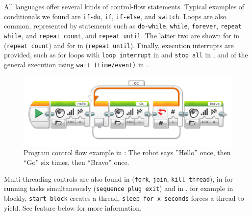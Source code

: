  All languages offer several kinds of control-flow statements. Typical examples of conditionals we found are \texttt{if-do}, \texttt{if}, \texttt{if-else}, and \texttt{switch}. Loops are also common, represented by statements such as \texttt{do-while}, \texttt{while}, \texttt{forever}, \texttt{repeat while}, and \texttt{repeat count}, and \texttt{repeat until}. The latter two are shown for \lego in  (\texttt{repeat count}) and for \robotc in  (\texttt{repeat until}). Finally, execution interrupts are provided, such as for loops with \texttt{loop interrupt} in \lego and \texttt{stop all} in \tello, and of the general execution using \texttt{wait (time/event)} in \makeblock.

\begin{figure}[t]
     \centering
    \includegraphics[width=1\columnwidth]{legoLoop.png}
      \caption{Program control flow example in \lego: The robot says ''Hello'' once, then ``Go'' six times, then ``Bravo'' once.}
      \label{fig:legoloopcount}
			\vspace{-.4cm}
   \end{figure}


Multi-threading controls are also found in \trik (\texttt{fork}, \texttt{join}, \texttt{kill thread}), in  \lego for running tasks simultaneously (\texttt{sequence plug exit}) and in \robotmesh, for example in blockly,  \texttt{start block} creates a thread, \texttt{sleep for x seconds} forces a thread to yield. See feature \fmultithread below for more information.

